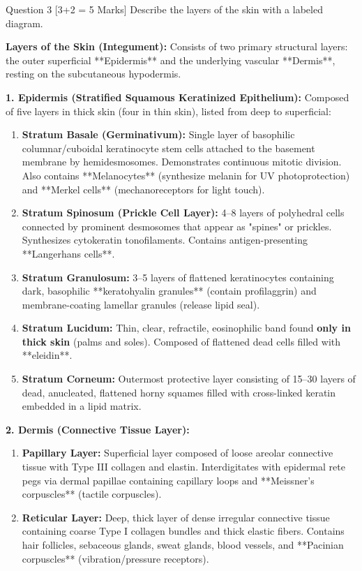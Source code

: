 \documentclass[11pt,a4paper]{article}
\begin{document}
\begin{qbox}{Question 3 [3+2 = 5 Marks]}
Describe the layers of the skin with a labeled diagram.
\end{qbox}

\begin{ansbox}
\textbf{Layers of the Skin (Integument):}
Consists of two primary structural layers: the outer superficial **Epidermis** and the underlying vascular **Dermis**, resting on the subcutaneous hypodermis.

\textbf{1. Epidermis (Stratified Squamous Keratinized Epithelium):}
Composed of five layers in thick skin (four in thin skin), listed from deep to superficial:
\begin{enumerate}[leftmargin=*]
    \item \textbf{Stratum Basale (Germinativum):} Single layer of basophilic columnar/cuboidal keratinocyte stem cells attached to the basement membrane by hemidesmosomes. Demonstrates continuous mitotic division. Also contains **Melanocytes** (synthesize melanin for UV photoprotection) and **Merkel cells** (mechanoreceptors for light touch).
    \item \textbf{Stratum Spinosum (Prickle Cell Layer):} 4--8 layers of polyhedral cells connected by prominent desmosomes that appear as "spines" or prickles. Synthesizes cytokeratin tonofilaments. Contains antigen-presenting **Langerhans cells**.
    \item \textbf{Stratum Granulosum:} 3--5 layers of flattened keratinocytes containing dark, basophilic **keratohyalin granules** (contain profilaggrin) and membrane-coating lamellar granules (release lipid seal).
    \item \textbf{Stratum Lucidum:} Thin, clear, refractile, eosinophilic band found \textbf{only in thick skin} (palms and soles). Composed of flattened dead cells filled with **eleidin**.
    \item \textbf{Stratum Corneum:} Outermost protective layer consisting of 15--30 layers of dead, anucleated, flattened horny squames filled with cross-linked keratin embedded in a lipid matrix.
\end{enumerate}

\textbf{2. Dermis (Connective Tissue Layer):}
\begin{enumerate}[leftmargin=*]
    \item \textbf{Papillary Layer:} Superficial layer composed of loose areolar connective tissue with Type III collagen and elastin. Interdigitates with epidermal rete pegs via dermal papillae containing capillary loops and **Meissner's corpuscles** (tactile corpuscles).
    \item \textbf{Reticular Layer:} Deep, thick layer of dense irregular connective tissue containing coarse Type I collagen bundles and thick elastic fibers. Contains hair follicles, sebaceous glands, sweat glands, blood vessels, and **Pacinian corpuscles** (vibration/pressure receptors).
\end{enumerate}
\end{ansbox}
\end{document}
